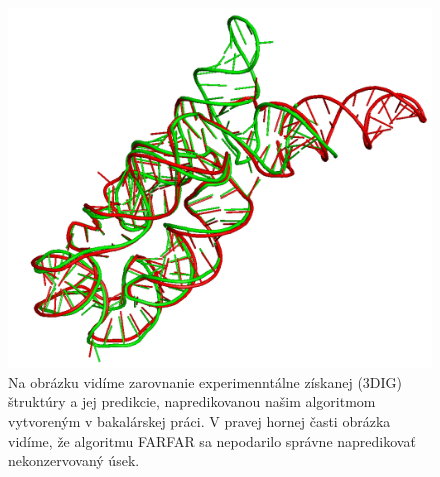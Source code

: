 \begin{figure}%
\includegraphics[width=\textwidth]{../img/badPredictedRegion}
\caption{Na obrázku vidíme zarovnanie experimenntálne získanej (3DIG) štruktúry a jej predikcie, napredikovanou našim algoritmom vytvoreným v bakalárskej práci. V pravej hornej časti obrázka vidíme, že algoritmu FARFAR sa nepodarilo správne napredikovať nekonzervovaný úsek.}
\label{obr3.3:badPredictedRegion}
\end{figure}
